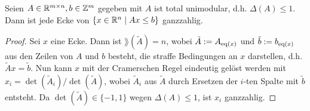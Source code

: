 \begin{lemma}\label{lem:unimodular}
	Seien $A\in\mathbb{R}^{m\times n},b\in\mathbb{Z}^m$ gegeben mit $A$ ist total unimodular, d.h. $\Delta(A)\leq 1$. Dann ist jede Ecke von $\{x\in\mathbb{R}^n \mid Ax\leq b \}$ ganzzahlig.
\end{lemma}
\begin{proof}
	Sei $x$ eine Ecke. Dann ist $\rang(\tilde{A})=n$, wobei $\tilde{A} := A_{\operatorname{eq}(x)}$ und $\tilde{b}:=b_{\operatorname{eq}(x)}$ aus den Zeilen von $A$ und $b$ besteht, die straffe Bedingungen an $x$ darstellen, d.h. $\tilde{A} x = \tilde{b}$.
	Nun kann $x$ mit der Cramerschen Regel eindeutig gelöst werden mit $x_i=\det(\tilde{A}_i)/\det(\tilde{A})$, wobei $\tilde{A}_i$ aus $\tilde{A}$ durch Ersetzen der $i$-ten Spalte mit $\tilde{b}$ entsteht.
	Da $\det(\tilde{A})\in\{-1,1\}$ wegen $\Delta(A)\leq 1$, ist $x_i$ ganzzahlig.
\end{proof}

